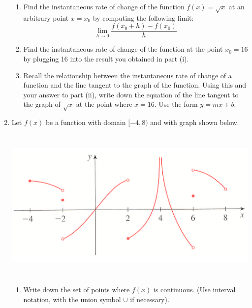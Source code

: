 \documentclass[fleqn,12pt]{article}
\newcommand{\<}{\ensuremath{\langle}}
\renewcommand{\>}{\ensuremath{\rangle}}
\begin{document}
\begin{enumerate}
      \begin{enumerate}[{(i)}]
      \item Find the instantaneous rate of change of the function $f(x) = \sqrt{x}$ at an arbitrary point
        $x = x_0$ by computing the following limit:
        \[
        \lim_{h \rightarrow 0} \frac{f(x_0 + h) - f(x_0)}{h}
        \]

        \vskip4cm

      \item Find the instantaneous rate of change of the
        function at the point  $x_0 = 16$ by plugging 16 into the result you obtained in part (i).

        \vskip4cm

      \item Recall the relationship between the instantaneous rate of change of a
        function and the line tangent to the graph of the function. Using this and your
        answer to part (ii), write down the equation of the line tangent to the graph
        of $\sqrt{x}$ at the point where $x = 16$. Use the form $y = mx + b$.

      \end{enumerate}

      \newpage


    \item Let $f(x)$ be a function with domain $[-4, 8)$ and with graph shown
      below. 

      \begin{center}
        \includegraphics[height=3in]{Problem254}
      \end{center}

      \bigskip
      \begin{enumerate}
      \item 
        Write down the set of points where $f(x)$
        is continuous. (Use interval notation, with the union symbol $\cup$ if
        necessary). 


\end{enumerate}
\end{enumerate}
\end{document}
